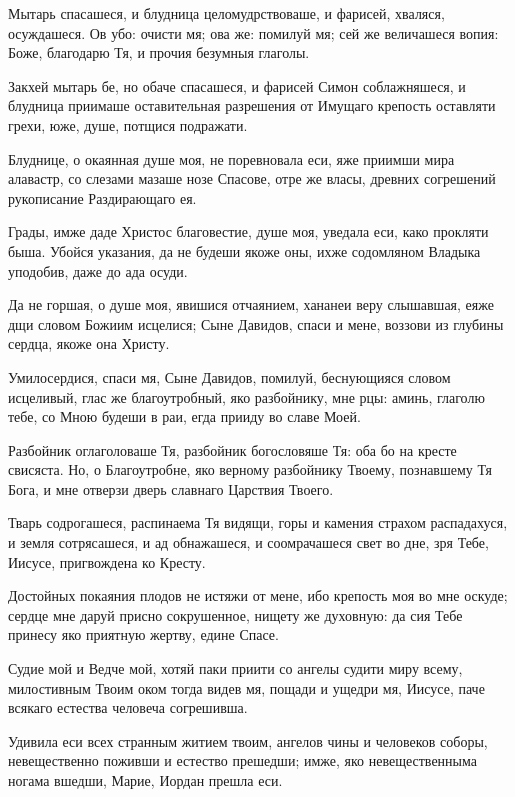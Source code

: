 Мытарь спасашеся, и блудница целомудрствоваше, и фарисей, хваляся, осуждашеся. Ов убо: очисти мя; ова же: помилуй мя; сей же величашеся вопия: Боже, благодарю Тя, и прочия безумныя глаголы.


Закхей мытарь бе, но обаче спасашеся, и фарисей Симон соблажняшеся, и блудница приимаше оставительная разрешения от Имущаго крепость оставляти грехи, юже, душе, потщися подражати.


Блуднице, о окаянная душе моя, не поревновала еси, яже приимши мира алавастр, со слезами мазаше нозе Спасове, отре же власы, древних согрешений рукописание Раздирающаго ея.


Грады, имже даде Христос благовестие, душе моя, уведала еси, како прокляти быша. Убойся указания, да не будеши якоже оны, ихже содомляном Владыка уподобив, даже до ада осуди.


Да не горшая, о душе моя, явишися отчаянием, хананеи веру слышавшая, еяже дщи словом Божиим исцелися; Сыне Давидов, спаси и мене, воззови из глубины сердца, якоже она Христу.


Умилосердися, спаси мя, Сыне Давидов, помилуй, беснующияся словом исцеливый, глас же благоутробный, яко разбойнику, мне рцы: аминь, глаголю тебе, со Мною будеши в раи, егда прииду во славе Моей.


Разбойник оглаголоваше Тя, разбойник богословяше Тя: оба бо на кресте свисяста. Но, о Благоутробне, яко верному разбойнику Твоему, познавшему Тя Бога, и мне отверзи дверь славнаго Царствия Твоего.


Тварь содрогашеся, распинаема Тя видящи, горы и камения страхом распадахуся, и земля сотрясашеся, и ад обнажашеся, и соомрачашеся свет во дне, зря Тебе, Иисусе, пригвождена ко Кресту.


Достойных покаяния плодов не истяжи от мене, ибо крепость моя во мне оскуде; сердце мне даруй присно сокрушенное, нищету же духовную: да сия Тебе принесу яко приятную жертву, едине Спасе.


Судие мой и Ведче мой, хотяй паки приити со ангелы судити миру всему, милостивным Твоим оком тогда видев мя, пощади и ущедри мя, Иисусе, паче всякаго естества человеча согрешивша.




Удивила еси всех странным житием твоим, ангелов чины и человеков соборы, невещественно поживши и естество прешедши; имже, яко невещественныма ногама вшедши, Марие, Иордан прешла еси.




